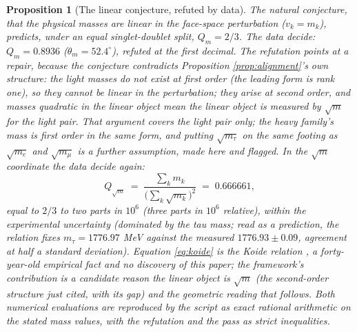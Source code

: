 \documentclass[11pt]{article}
\newtheorem{proposition}[theorem]{Proposition}
\theoremstyle{definition}
\begin{document}
\begin{proposition}[The linear conjecture, refuted by data]\label{prop:linearkill}
The natural conjecture, that the physical masses are linear in the face-space perturbation ($v_{k} = m_{k}$), predicts, under an equal singlet-doublet split, $Q_{m} = 2/3$. The data decide: $Q_{m} = 0.8936$ ($\theta_{m} = 52.4^{\circ}$), refuted at the first decimal. The refutation points at a repair, because the conjecture contradicts Proposition \ref{prop:alignment}'s own structure: the light masses do not exist at first order (the leading form is rank one), so they cannot be linear in the perturbation; they arise at second order, and masses quadratic in the linear object mean the linear object is measured by $\sqrt{m}$ for the light pair. That argument covers the light pair only; the heavy family's mass is first order in the same form, and putting $\sqrt{m_{\tau}}$ on the same footing as $\sqrt{m_{e}}$ and $\sqrt{m_{\mu}}$ is a further assumption, made here and flagged. In the $\sqrt{m}$ coordinate the data decide again:
\begin{equation}\label{eq:koide}
Q_{\sqrt{m}} \;=\; \frac{\sum_{k} m_{k}}{\bigl(\sum_{k}\sqrt{m_{k}}\bigr)^{2}} \;=\; 0.666661,
\end{equation}
equal to $2/3$ to two parts in $10^{6}$ (three parts in $10^{6}$ relative), within the experimental uncertainty (dominated by the tau mass; read as a prediction, the relation fixes $m_{\tau} = 1776.97$ MeV against the measured $1776.93 \pm 0.09$, agreement at half a standard deviation). Equation \eqref{eq:koide} is the Koide relation \cite{Koide1982}, a forty-year-old empirical fact and no discovery of this paper; the framework's contribution is a candidate reason the linear object is $\sqrt{m}$ (the second-order structure just cited, with its gap) and the geometric reading that follows. Both numerical evaluations are reproduced by the script as exact rational arithmetic on the stated mass values, with the refutation and the pass as strict inequalities.
\end{proposition}
\end{document}
